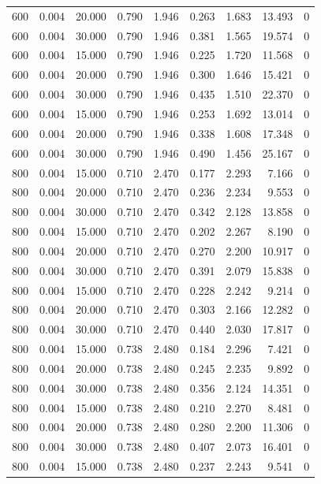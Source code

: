 \begin{tabular}{rrrrrrrrr}
600 & 0.004 & 20.000 & 0.790 & 1.946 & 0.263 & 1.683 & 13.493 & 0 \\
600 & 0.004 & 30.000 & 0.790 & 1.946 & 0.381 & 1.565 & 19.574 & 0 \\
600 & 0.004 & 15.000 & 0.790 & 1.946 & 0.225 & 1.720 & 11.568 & 0 \\
600 & 0.004 & 20.000 & 0.790 & 1.946 & 0.300 & 1.646 & 15.421 & 0 \\
600 & 0.004 & 30.000 & 0.790 & 1.946 & 0.435 & 1.510 & 22.370 & 0 \\
600 & 0.004 & 15.000 & 0.790 & 1.946 & 0.253 & 1.692 & 13.014 & 0 \\
600 & 0.004 & 20.000 & 0.790 & 1.946 & 0.338 & 1.608 & 17.348 & 0 \\
600 & 0.004 & 30.000 & 0.790 & 1.946 & 0.490 & 1.456 & 25.167 & 0 \\
800 & 0.004 & 15.000 & 0.710 & 2.470 & 0.177 & 2.293 & 7.166 & 0 \\
800 & 0.004 & 20.000 & 0.710 & 2.470 & 0.236 & 2.234 & 9.553 & 0 \\
800 & 0.004 & 30.000 & 0.710 & 2.470 & 0.342 & 2.128 & 13.858 & 0 \\
800 & 0.004 & 15.000 & 0.710 & 2.470 & 0.202 & 2.267 & 8.190 & 0 \\
800 & 0.004 & 20.000 & 0.710 & 2.470 & 0.270 & 2.200 & 10.917 & 0 \\
800 & 0.004 & 30.000 & 0.710 & 2.470 & 0.391 & 2.079 & 15.838 & 0 \\
800 & 0.004 & 15.000 & 0.710 & 2.470 & 0.228 & 2.242 & 9.214 & 0 \\
800 & 0.004 & 20.000 & 0.710 & 2.470 & 0.303 & 2.166 & 12.282 & 0 \\
800 & 0.004 & 30.000 & 0.710 & 2.470 & 0.440 & 2.030 & 17.817 & 0 \\
800 & 0.004 & 15.000 & 0.738 & 2.480 & 0.184 & 2.296 & 7.421 & 0 \\
800 & 0.004 & 20.000 & 0.738 & 2.480 & 0.245 & 2.235 & 9.892 & 0 \\
800 & 0.004 & 30.000 & 0.738 & 2.480 & 0.356 & 2.124 & 14.351 & 0 \\
800 & 0.004 & 15.000 & 0.738 & 2.480 & 0.210 & 2.270 & 8.481 & 0 \\
800 & 0.004 & 20.000 & 0.738 & 2.480 & 0.280 & 2.200 & 11.306 & 0 \\
800 & 0.004 & 30.000 & 0.738 & 2.480 & 0.407 & 2.073 & 16.401 & 0 \\
800 & 0.004 & 15.000 & 0.738 & 2.480 & 0.237 & 2.243 & 9.541 & 0 \\

\end{tabular}
